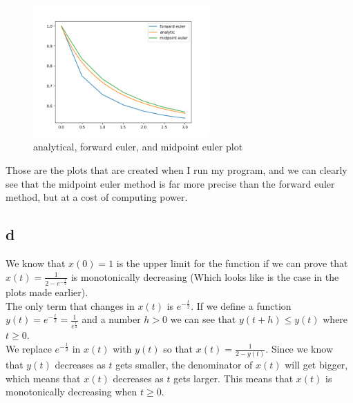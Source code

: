 \documentclass{article}
\begin{document}
\begin{figure}[h]
    \centering
    \includegraphics[width=0.6\textwidth]{task_2c}
    \caption{analytical, forward euler, and midpoint euler plot}
\end{figure}

Those are the plots that are created when I run my program, and we can clearly see that the midpoint euler
method is far more precise than the forward euler method, but at a cost of computing power.

\newpage

\subsection*{d}

We know that $x(0) = 1$ is the upper limit for the function if we can prove that $x(t) = \frac{1}{2 - e^{- \frac{t}{2}}}$
is monotonically decreasing (Which looks like is the case in the plots made earlier). \\
The only term that changes in $x(t)$ is $e^{- \frac{t}{2}}$. If we define a function \\
$y(t) = e^{- \frac{t}{2}} = \frac{1}{e^{\frac{t}{2}}}$ and a number $h > 0$ we can see that $y(t + h) \le y(t)$
where $t \ge 0$. \\
We replace $e^{- \frac{t}{2}}$ in $x(t)$ with $y(t)$ so that $x(t) = \frac{1}{2 - y(t)}$. Since we know that $y(t)$
decreases as $t$ gets smaller, the denominator of $x(t)$ will get bigger, which means that $x(t)$ decreases as $t$
gets larger. This means that $x(t)$ is monotonically decreasing when $t \ge 0$. \\ \\
\end{document}
